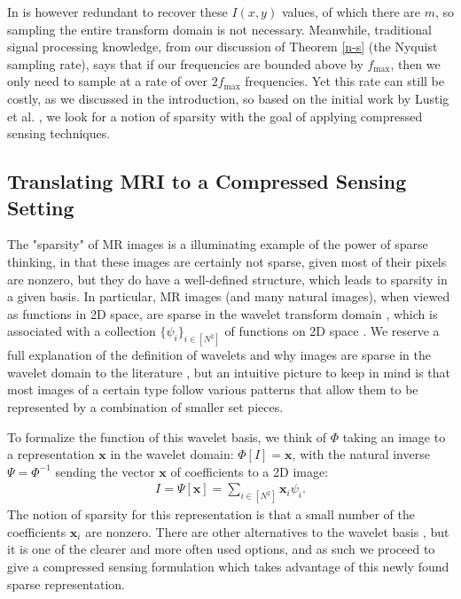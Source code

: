 \documentclass[12pt,a4paper]{amsart}
\numberwithin{equation}{section}
\theoremstyle{plain}
\theoremstyle{definition}
\newcommand{\bdx}{\mathbf{x}}
\begin{document}
In is however redundant to recover these $I(x,y)$ values, of which there are $m$, so sampling the entire transform domain is not necessary. Meanwhile, traditional signal processing knowledge, from our discussion of Theorem \ref{n-s} (the Nyquist sampling rate), says that if our frequencies are bounded above by $f_{\max}$, then we only need to sample at a rate of over $2f_\max$ frequencies. Yet this rate can still be costly, as we discussed in the introduction, so based on the initial work by Lustig et al. \cite{lustig}, we look for a notion of sparsity with the goal of applying compressed sensing techniques.


\subsection{Translating MRI to a Compressed Sensing Setting}\label{mri-cs-setting}

The "sparsity" of MR images is a illuminating example of the power of sparse thinking, in that these images are certainly not sparse, given most of their pixels are nonzero, but they do have a well-defined structure, which leads to sparsity in a given basis. In particular, MR images (and many natural images), when viewed as functions in 2D space, are sparse in the wavelet transform domain \cite{lustig}, which is associated with a collection $\{\psi_i\}_{i\in[N^2]}$ of functions on 2D space \cite{wm}. We reserve a full explanation of the definition of wavelets and why images are sparse in the wavelet domain to the literature \cite{lustig}, but an intuitive picture to keep in mind is that most images of a certain type follow various patterns that allow them to be represented by a combination of smaller set pieces. 

To formalize the function of this wavelet basis, we think of $\Phi$ taking an image to a representation $\bdx$ in the wavelet domain: $\Phi[I]=\bdx$, with the natural inverse $\Psi=\Phi^{-1}$ sending the vector $\bdx$ of coefficients to a 2D image:
\begin{align*}
    I=\Psi[\bdx]=\sum_{i\in[N^2]}\bdx_i\psi_i.
\end{align*}
The notion of sparsity for this representation is that a small number of the coefficients $\bdx_i$ are nonzero. There are other alternatives to the wavelet basis \cite{wm}, but it is one of the clearer and more often used options, and as such we proceed to give a compressed sensing formulation which takes advantage of this newly found sparse representation.
\end{document}
